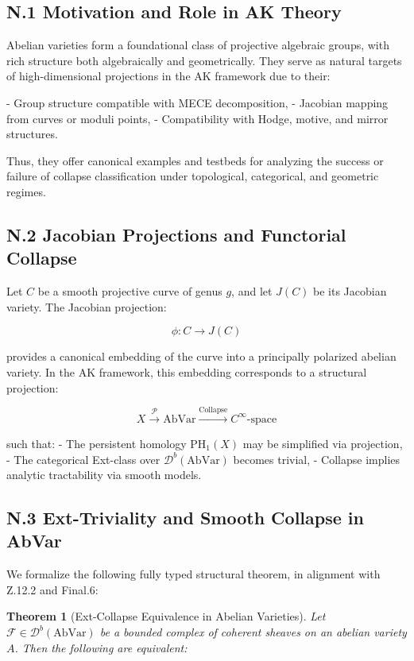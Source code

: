 \documentclass[11pt]{article}
\newtheorem{theorem}{Theorem}[section]
\begin{document}
\begin{axiom}
\begin{axiom}
{{\subsection*{N.1 Motivation and Role in AK Theory}

Abelian varieties form a foundational class of projective algebraic groups, with rich structure both algebraically and geometrically.  
They serve as natural targets of high-dimensional projections in the AK framework due to their:

- Group structure compatible with MECE decomposition,
- Jacobian mapping from curves or moduli points,
- Compatibility with Hodge, motive, and mirror structures.

Thus, they offer canonical examples and testbeds for analyzing the success or failure of collapse classification under topological, categorical, and geometric regimes.

\subsection*{N.2 Jacobian Projections and Functorial Collapse}

Let \( C \) be a smooth projective curve of genus \( g \), and let \( J(C) \) be its Jacobian variety.  
The Jacobian projection:

\[
\phi: C \longrightarrow J(C)
\]

provides a canonical embedding of the curve into a principally polarized abelian variety.  
In the AK framework, this embedding corresponds to a structural projection:

\[
X \xrightarrow{\mathcal{P}} \mathrm{AbVar} \xrightarrow{\text{Collapse}} C^\infty\text{-space}
\]

such that:
- The persistent homology \( \mathrm{PH}_1(X) \) may be simplified via projection,
- The categorical Ext-class over \( \mathcal{D}^b(\mathrm{AbVar}) \) becomes trivial,
- Collapse implies analytic tractability via smooth models.

\subsection*{N.3 Ext-Triviality and Smooth Collapse in AbVar}

We formalize the following fully typed structural theorem, in alignment with Z.12.2 and Final.6:

\begin{theorem}[Ext-Collapse Equivalence in Abelian Varieties]
Let \( \mathcal{F} \in \mathcal{D}^b(\mathrm{AbVar}) \) be a bounded complex of coherent sheaves on an abelian variety \( A \).  
Then the following are equivalent:


\end{theorem}}}
\end{axiom}
\end{axiom}
\end{document}
